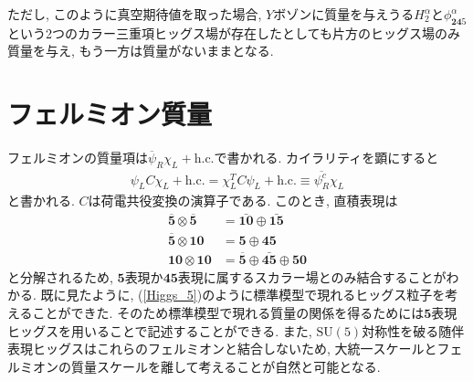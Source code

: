 ただし, このように真空期待値を取った場合, $Y$ボゾンに質量を与えうる$H_2^\alpha$と$\phi_{\bm{24}5}^\alpha$という2つのカラー三重項ヒッグス場が存在したとしても片方のヒッグス場のみ質量を与え, もう一方は質量がないままとなる.


\section{フェルミオン質量}
フェルミオンの質量項は$\overline{\psi}_R\chi_L +\mathrm{h.c.}$で書かれる.
カイラリティを顕にすると
\begin{align}
  \psi_L C \chi_L + \mathrm{h.c.} = \chi_L^T C \psi_L + \mathrm{h.c.} \equiv \overline{\psi_R^c}\chi_L
\end{align}
と書かれる. $C$は荷電共役変換の演算子である.
このとき, 直積表現は
\begin{align}
  \overline{\bm{5}}\otimes \overline{\bm{5}} &= \bar{\bm{10}}\oplus\bar{\bm{15}}\label{decon_55}\\
  \overline{\bm{5}}\otimes {\bm{10}} &= \bm{5}\oplus\bm{45}\label{decon_510}\\
  \bm{10}\otimes \bm{10} &= \overline{\bm{5}}\oplus\bar{\bm{45}}\oplus\bm{50}\label{decon_1010}
\end{align}
と分解されるため, $\bm{5}$表現か$\bm{45}$表現に属するスカラー場とのみ結合することがわかる.
既に見たように, (\ref{Higgs_5})のように標準模型で現れるヒッグス粒子を考えることができた.
そのため標準模型で現れる質量の関係を得るためには$\bm{5}$表現ヒッグスを用いることで記述することができる.
また, $\mathrm{SU(5)}$対称性を破る随伴表現ヒッグスはこれらのフェルミオンと結合しないため, 大統一スケールとフェルミオンの質量スケールを離して考えることが自然と可能となる.

